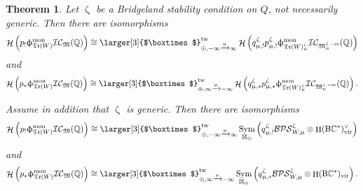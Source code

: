 \documentclass[a4paper,10pt]{amsart}
\renewcommand{\zeta}{\upzeta}
\renewcommand{\phi}{\upphi}
\renewcommand{\mu}{\upmu}
\newtheorem{theorem}{Theorem}[section]
\DeclareMathOperator{\BC}{B\mathbb{C}^*}
\newcommand{\Boxtimes}{\mbox{\larger[3]{$\boxtimes$}}}
\newcommand{\WWW}{\mathfrak{Tr}(W)}
\newcommand{\Mst}{\mathfrak{M}}
\newcommand{\ICS}{\mathcal{IC}}
\newcommand{\DTS}{\mathcal{BPS}}
\newcommand{\phim}[1]{\phi^{\mon}_{#1}}
\DeclareMathOperator{\sst}{-ss}
\DeclareMathOperator{\tw}{tw}
\DeclareMathOperator{\mon}{mon}
\DeclareMathOperator{\Sym}{Sym}
\DeclareMathOperator{\vir}{vir}
\DeclareMathOperator{\Ho}{\mathcal{H}}
\DeclareMathOperator{\HO}{H}
\begin{document}
\begin{theorem}
\label{gcDT}
Let $\zeta$ be a Bridgeland stability condition on $Q$, not necessarily generic.  Then there are isomorphisms
\begin{equation}
\label{ngwc}
\Ho\left(p_!\phim{\WWW}\ICS_{\Mst}(\mathbb{Q})\right)\cong\Boxtimes_{\oplus, -\infty\xrightarrow{\mu} \infty}^{\tw} \Ho\left(q_{\mu,!}^{\zeta}p_{\mu,!}^{\zeta}\phim{\WWW_{\mu}^{\zeta}}\ICS_{\Mst_{\mu}^{\zeta\sst}}(\mathbb{Q})\right)
\end{equation}
and
\begin{equation}
\label{ngwcnc}
\Ho\left(p_*\phim{\WWW}\ICS_{\Mst}(\mathbb{Q})\right)\cong\Boxtimes_{\oplus, \infty\xrightarrow{\mu} -\infty}^{\tw} \Ho\left(q_{\mu,*}^{\zeta}p_{\mu,*}^{\zeta}\phim{\WWW_{\mu}^{\zeta}}\ICS_{\Mst_{\mu}^{\zeta\sst}}(\mathbb{Q})\right).
\end{equation}

Assume in addition that $\zeta$ is generic.  Then there are isomorphisms
\begin{equation}
\label{gwPBW}
\Ho\left(p_!\phim{\WWW}\ICS_{\Mst}(\mathbb{Q})\right)\cong \Boxtimes_{\oplus,-\infty \xrightarrow{\mu}\infty}^{\tw} \Sym_{\boxtimes_{\oplus}}\left(q_{\mu,!}^{\zeta}\DTS_{W,\mu}^{\zeta}\otimes\HO(\BC )^{\vee}_{\vir}\right)
\end{equation}
and
\begin{equation}
\label{gwPBWnc}
\Ho\left(p_*\phim{\WWW}\ICS_{\Mst}(\mathbb{Q})\right)\cong \Boxtimes_{\oplus, \infty\xrightarrow{\mu} -\infty }^{\tw} \Sym_{\boxtimes_{\oplus}}\left(q_{\mu,*}^{\zeta}\DTS_{W,\mu}^{\zeta}\otimes\HO(\BC )_{\vir}\right).
\end{equation}
\end{theorem}
\end{document}
